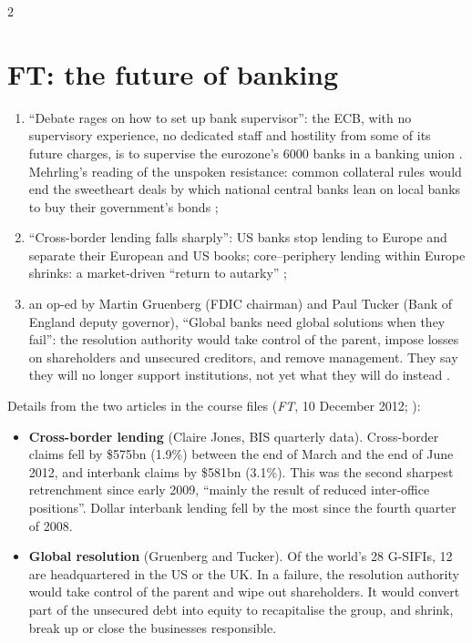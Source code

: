 \begin{paracol}{2}
\section{FT: the future of banking}\label{sec:tv-ft}

\begin{casestudy}
\begin{enumerate}
  \item ``Debate rages on how to set up bank supervisor'': the ECB, with no supervisory experience, no dedicated staff and hostility from some of its future charges, is
        to supervise the eurozone's 6000 banks in a banking union . Mehrling's reading of the unspoken resistance: common
        collateral rules would end the sweetheart deals by which national central banks lean on local banks to buy their government's bonds ;
  \item ``Cross-border lending falls sharply'': US banks stop lending to Europe and separate their European and US books; core--periphery lending within Europe shrinks: a
        market-driven ``return to autarky'' ;
  \item an op-ed by Martin Gruenberg (FDIC chairman) and Paul Tucker (Bank of England deputy governor), ``Global banks need global solutions when they fail'': the
        resolution authority would take control of the parent, impose losses on shareholders and unsecured creditors, and remove management. They say they will no longer
        support institutions, not yet what they will do instead .
\end{enumerate}
Details from the two articles in the course files (\emph{FT}, 10 December 2012; ):
\begin{itemize}
  \item \textbf{Cross-border lending} (Claire Jones, BIS quarterly data). Cross-border claims fell by \$575bn (1.9\%) between the end of March and the end of June 2012, and interbank claims by \$581bn (3.1\%). This was the second sharpest retrenchment since early 2009, ``mainly the result of reduced inter-office positions''. Dollar interbank lending fell by the most since the fourth quarter of 2008.
  \item \textbf{Global resolution} (Gruenberg and Tucker). Of the world's 28 G-SIFIs, 12 are headquartered in the US or the UK. In a failure, the resolution authority would take control of the parent and wipe out shareholders. It would convert part of the unsecured debt into equity to recapitalise the group, and shrink, break up or close the businesses responsible.
\end{itemize}
\end{casestudy}


\end{paracol}
